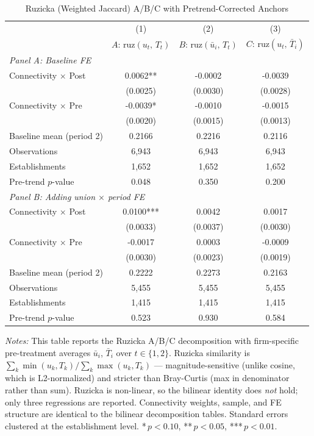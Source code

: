 \begin{table}[H]
\centering
\caption{Ruzicka (Weighted Jaccard) A/B/C with Pretrend-Corrected Anchors}
\label{tab:ruzicka_pretrend_anchored}
\scriptsize
\setlength{\tabcolsep}{8pt}
\begin{tabular}{lccc}
\hline\hline
 & (1) & (2) & (3) \\
 & \textbf{$A:\,\text{ruz}(u_t,\,T_t)$} & \textbf{$B:\,\text{ruz}(\bar u_i,\,T_t)$} & \textbf{$C:\,\text{ruz}(u_t,\,\bar T_i)$} \\
\hline
\multicolumn{4}{l}{\textit{Panel A: Baseline FE}} \\
Connectivity $\times$ Post & 0.0062** & -0.0002 & -0.0039 \\
 & (0.0025) & (0.0030) & (0.0028) \\
Connectivity $\times$ Pre & -0.0039* & -0.0010 & -0.0015 \\
 & (0.0020) & (0.0015) & (0.0013) \\
Baseline mean (period 2) & 0.2166 & 0.2216 & 0.2116 \\
Observations & 6,943 & 6,943 & 6,943 \\
Establishments & 1,652 & 1,652 & 1,652 \\
Pre-trend $p$-value & 0.048 & 0.350 & 0.200 \\
\hline
\multicolumn{4}{l}{\textit{Panel B: Adding union $\times$ period FE}} \\
Connectivity $\times$ Post & 0.0100*** & 0.0042 & 0.0017 \\
 & (0.0033) & (0.0037) & (0.0030) \\
Connectivity $\times$ Pre & -0.0017 & 0.0003 & -0.0009 \\
 & (0.0030) & (0.0023) & (0.0019) \\
Baseline mean (period 2) & 0.2222 & 0.2273 & 0.2163 \\
Observations & 5,455 & 5,455 & 5,455 \\
Establishments & 1,415 & 1,415 & 1,415 \\
Pre-trend $p$-value & 0.523 & 0.930 & 0.584 \\
\hline
\hline\hline
\end{tabular}
\begin{minipage}{\linewidth}
\smallskip
\scriptsize\textit{Notes:} This table reports the Ruzicka A/B/C decomposition with firm-specific pre-treatment averages $\bar u_i$, $\bar T_i$ over $t \in \{1,2\}$. Ruzicka similarity is $\sum_k \min(u_k, T_k) / \sum_k \max(u_k, T_k)$ --- magnitude-sensitive (unlike cosine, which is L2-normalized) and stricter than Bray-Curtis (max in denominator rather than sum). Ruzicka is non-linear, so the bilinear identity does \emph{not} hold; only three regressions are reported. Connectivity weights, sample, and FE structure are identical to the bilinear decomposition tables. Standard errors clustered at the establishment level. *\,$p<0.10$, **\,$p<0.05$, ***\,$p<0.01$.
\end{minipage}
\end{table}
